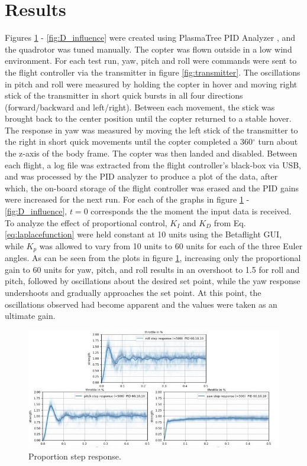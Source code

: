 \documentclass[11pt]{ucthesis}
\begin{document}
\section{Results}
 Figures \ref{fig:P_influence} - \ref{fig:D_influence} were created using PlasmaTree PID Analyzer \cite{plasmatree}, and the quadrotor was tuned manually. The copter was flown outside in a low wind environment. For each test run, yaw, pitch and roll were commands were sent to the flight controller via the transmitter in figure \ref{fig:transmitter}. The oscillations in pitch and roll were measured by holding the copter in hover and moving right stick of the transmitter in short quick bursts in all four directions (forward/backward and left/right). Between each movement, the stick was brought back to the center position until the copter returned to a stable hover. The response in yaw was measured by moving the left stick of the transmitter to the right in short quick movements until the copter completed a 360$^\circ$ turn about the z-axis of the body frame. The copter was then landed and disabled. Between each flight, a log file was extracted from the flight controller's black-box via USB, and was processed by the PID analyzer to produce a plot of the data, after which, the on-board storage of the flight controller was erased and the PID gains were increased for the next run. For each of the graphs in figure \ref{fig:P_influence} - \ref{fig:D_influence}, $t=0$ corresponds the the moment the input data is received. To analyze the effect of proportional control, $K_I$ and $K_D$ from Eq. \ref{eq:laplacefunction} were held constant at 10 units using the Betaflight GUI, while $K_p$ was allowed to vary from 10 units to 60 units for each of the three Euler angles. As can be seen from the plots in figure \ref{fig:P_influence}, increasing only the proportional gain to 60 units for yaw, pitch, and roll results in an overshoot to 1.5 for roll and pitch, followed by oscillations about the desired set point, while the yaw response undershoots and gradually approaches the set point. At this point, the oscillations observed had become apparent and the values were taken as an ultimate gain.
\begin{figure}[H]
	\includegraphics[width=1\textwidth]{P_influence}
	\caption[Proportion step response]{Proportion step response. }
	\label{fig:P_influence}
\end{figure}
\end{document}
